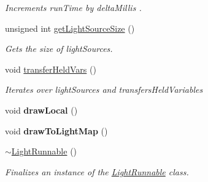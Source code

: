 \begin{DoxyCompactItemize}
\begin{DoxyCompactList}\small\item\em Increments run\+Time by {\itshape delta\+Millis} . \end{DoxyCompactList}\item 
unsigned int \hyperlink{classlighting_1_1LightRunnable_ac039130d254dcb59bd485e42f3585c45}{get\+Light\+Source\+Size} ()
\begin{DoxyCompactList}\small\item\em Gets the size of light\+Sources. \end{DoxyCompactList}\item 
void \hyperlink{classlighting_1_1LightRunnable_a0e2e8e6f3090969998cebb01588afe33}{transfer\+Held\+Vars} ()
\begin{DoxyCompactList}\small\item\em Iterates over light\+Sources and transfers\+Held\+Variables \end{DoxyCompactList}\item 
void {\bfseries draw\+Local} ()\hypertarget{classlighting_1_1LightRunnable_a5e2b8229dd0d4b3ed1a0bde641af0886}{}\label{classlighting_1_1LightRunnable_a5e2b8229dd0d4b3ed1a0bde641af0886}

\item 
void {\bfseries draw\+To\+Light\+Map} ()\hypertarget{classlighting_1_1LightRunnable_a8a8df936784472ce9b1e9e11a8dd2dbd}{}\label{classlighting_1_1LightRunnable_a8a8df936784472ce9b1e9e11a8dd2dbd}

\item 
\hyperlink{classlighting_1_1LightRunnable_a2e6eaf9020185f1d33036c681c358399}{$\sim$\+Light\+Runnable} ()
\begin{DoxyCompactList}\small\item\em Finalizes an instance of the \hyperlink{classlighting_1_1LightRunnable}{Light\+Runnable} class. \end{DoxyCompactList}\end{DoxyCompactItemize}
